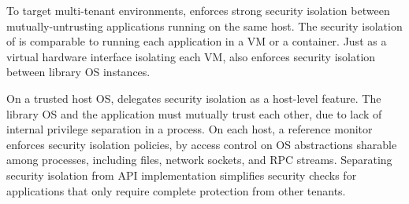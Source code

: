 \label{sec:overview:host:security}


To target multi-tenant environments, 
\graphene{} enforces strong security isolation between mutually-untrusting applications running on the same host.
The security isolation of \graphene{} is comparable to running each application
in a VM or a container.
Just as a virtual hardware interface isolating each VM,
\thehostabi{} also enforces security isolation between library OS instances.


On a trusted host OS,
\graphene{} delegates security isolation as a host-level feature.
The library OS and the application must mutually trust each other, due to lack of internal privilege separation in a process.
On each host, a reference monitor enforces security isolation policies, by access control on OS abstractions sharable among processes, including files, network sockets, and RPC streams.
Separating security isolation from API implementation simplifies security checks
for applications that only require
complete protection from other tenants.







